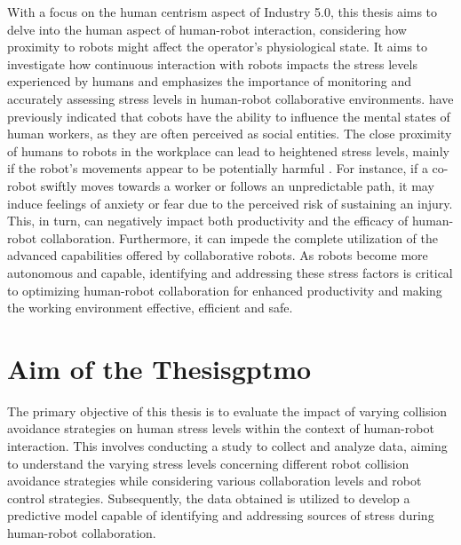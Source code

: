 With a focus on the human centrism aspect of Industry 5.0, this thesis aims to delve into the human aspect of human-robot interaction, considering how proximity to robots might affect the operator's physiological state. It aims to investigate how continuous interaction with robots impacts the stress levels experienced by humans and emphasizes the importance of monitoring and accurately assessing stress levels in human-robot collaborative environments. \textcite{Saupp} have previously indicated that cobots have the ability to influence the mental states of human workers, as they are often perceived as social entities. The close proximity of humans to robots in the workplace can lead to heightened stress levels, mainly if the robot's movements appear to be potentially harmful \parencite{Lasota}. For instance, if a co-robot swiftly moves towards a worker or follows an unpredictable path, it may induce feelings of anxiety or fear due to the perceived risk of sustaining an injury. This, in turn, can negatively impact both productivity and the efficacy of human-robot collaboration. Furthermore, it can impede the complete utilization of the advanced capabilities offered by collaborative robots. As robots become more autonomous and capable, identifying and addressing these stress factors is critical to optimizing human-robot collaboration for enhanced productivity and making the working environment effective, efficient and safe. 


\section{Aim of the Thesis\gls*{gptmo}}

The primary objective of this thesis is to evaluate the impact of varying collision avoidance strategies on human stress levels within the context of human-robot interaction. This involves conducting a study to collect and analyze data, aiming to understand the varying stress levels concerning different robot collision avoidance strategies while considering various collaboration levels and robot control strategies. Subsequently, the data obtained is utilized to develop a predictive model capable of identifying and addressing sources of stress during human-robot collaboration.



